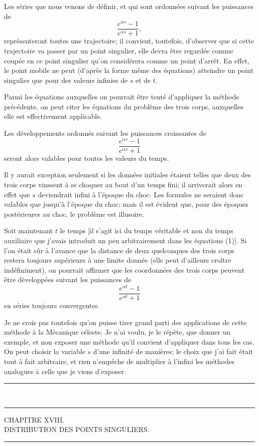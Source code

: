 \documentclass[11pt]{article}
\newcommand{\ornament}{\begin{center}\rule{2.5em}{0.4pt}\,\raisebox{0.1ex}{\tiny$\bullet\bullet\bullet$}\,\rule{2.5em}{0.4pt}\end{center}}
\newcommand{\shortline}{\begin{center}\rule{3.5em}{0.4pt}\end{center}}
\begin{document}
Les séries que nous venons de définir, et qui sont ordonnées suivant les puissances de
\[
\frac{e^{\alpha s}-1}{e^{\alpha s}+1},
\]
représenteront toutes une trajectoire; il convient, toutefois, d’observer que si cette trajectoire va passer par un point singulier, elle devra être regardée comme coupée en ce point singulier qu’on considérera comme un point d’arrêt. En effet, le point mobile ne peut (d’après la forme même des équations) atteindre un point singulier que pour des valeurs infinies de $s$ et de $t$.

Parmi les équations auxquelles on pourrait être tenté d’appliquer la méthode précédente, on peut citer les équations du problème des trois corps, auxquelles elle est effectivement applicable.

Les développements ordonnés suivant les puissances croissantes de
\[
\frac{e^{\alpha s}-1}{e^{\alpha s}+1}
\]
seront alors valables pour toutes les valeurs du temps.

Il y aurait exception seulement si les données initiales étaient telles que deux des trois corps vinssent à se choquer au bout d’un temps fini; il arriverait alors en effet que $s$ deviendrait infini à l’époque du choc. Les formules ne seraient donc valables que jusqu’à l’époque du choc; mais il est évident que, pour des époques postérieures au choc, le problème est illusoire.

Soit maintenant $t$ le temps [il s’agit ici du temps véritable et non du temps auxiliaire que j’avais introduit un peu arbitrairement dans les équations (1)]. Si l’on était sûr à l’avance que la distance de deux quelconques des trois corps restera toujours supérieure à une limite donnée (elle peut d’ailleurs croître indéfiniment), on pourrait affirmer que les coordonnées des trois corps peuvent être développées suivant les puissances de
\[
\frac{e^{\alpha t}-1}{e^{\alpha t}+1}
\]
en séries toujours convergentes.

Je ne crois pas toutefois qu’on puisse tirer grand parti des applications de cette méthode à la Mécanique céleste. Je n’ai voulu, je le répète, que donner un exemple, et non exposer une méthode qu’il convient d’appliquer dans tous les cas. On peut choisir la variable $s$ d’une infinité de manières; le choix que j’ai fait était tout à fait arbitraire, et rien n’empêche de multiplier à l’infini les méthodes analogues à celle que je viens d’exposer.

\ornament

\begin{center}
{\Large CHAPITRE XVIII.}\\[0.6em]
{\large DISTRIBUTION DES POINTS SINGULIERS.}
\end{center}
\shortline
\end{document}
